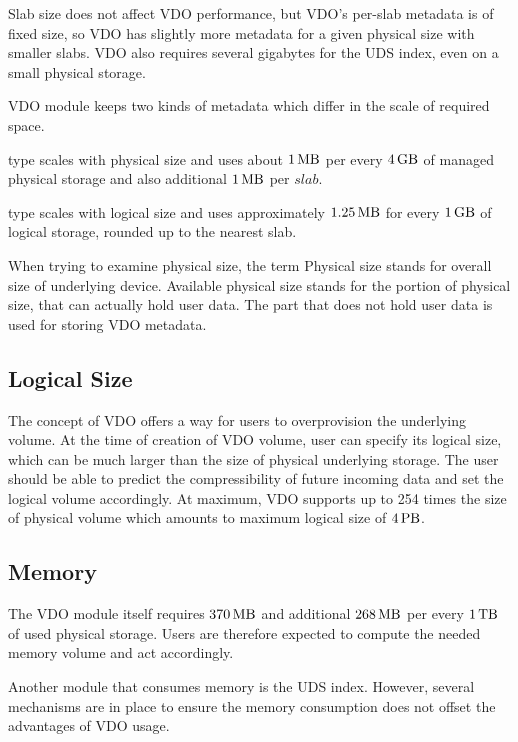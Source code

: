 \documentclass[
  color, %
  table, %
  lof,   %
  lot,   %
]{fithesis3}
\begin{document}
Slab size does not affect VDO performance, but VDO's per-slab metadata is of fixed size, so VDO has slightly more metadata for a given physical size with smaller slabs. VDO also requires several gigabytes for the UDS index, even on a small physical storage.

VDO module keeps two kinds of metadata which differ in the scale of required space.~\cite{man:requierements}
\begin{compactenum}
\item type scales with physical size and uses about $\SI{1}{\mega\byte}$ per every $\SI{4}{\giga\byte}$ of managed physical storage and also additional $\SI{1}{\mega\byte}$ per $slab$. 
\item type scales with logical size and uses approximately $\SI{1.25}{\mega\byte}$ for every $\SI{1}{\giga\byte}$ of logical storage, rounded up to the nearest slab.
\end{compactenum}

When trying to examine physical size, the term Physical size stands for overall size of underlying device. Available physical size stands for the portion of physical size, that can actually hold user data. The part that does not hold user data is used for storing VDO metadata.

\subsection{Logical Size}
The concept of VDO offers a way for users to overprovision the underlying volume. At the time of creation of VDO volume, user can specify its logical size, which can be much larger than the size of physical underlying storage. The user should be able to predict the compressibility of future incoming data and set the logical volume accordingly. At maximum, VDO supports up to 254 times the size of physical volume which amounts to maximum logical size of $\SI{4}{\peta\byte}$.

\subsection{Memory}
The VDO module itself requires $\SI{370}{\mega\byte}$ and additional $\SI{268}{\mega\byte}$ per every $\SI{1}{\tera\byte}$ of used physical storage. Users are therefore expected to compute the needed memory volume and act accordingly.

Another module that consumes memory is the UDS index. However, several mechanisms are in place to ensure the memory consumption does not offset the advantages of VDO usage.
\end{document}
